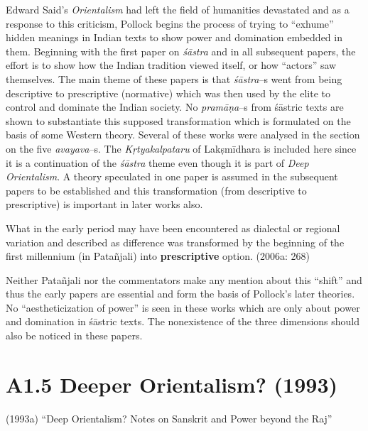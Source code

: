 Edward Said’s \textit{Orientalism} had left the field of humanities devastated and as a response to this criticism, Pollock begins the process of trying to “exhume” hidden meanings in Indian texts to show power and domination embedded in them. Beginning with the first paper on \textit{śāstra} and in all subsequent papers, the effort is to show how the Indian tradition viewed itself, or how “actors” saw themselves. The main theme of these papers is that \textit{śāstra}–s went from being descriptive to prescriptive (normative) which was then used by the elite to control and dominate the Indian society. No \textit{pramāṇa}–s from śāstric texts are shown to substantiate this supposed transformation which is formulated on the basis of some Western theory. Several of these works were analysed in the section on the five \textit{avayava}–s\break [4.6]. The \textit{Kṛtyakalpataru} of Lakṣmīdhara is included here since it is a continuation of the \textit{śāstra} theme even though it is part of \textit{Deep Orientalism}. A theory speculated in one paper is assumed in the subsequent papers to be established and this transformation (from descriptive to prescriptive) is important in later works also.

\begin{myquote}
What in the early period may have been encountered as dialectal or regional variation and described as difference was transformed by the beginning of the ﬁrst millennium (in Patañjali) into \textbf{prescriptive} option. (2006a: 268)
\end{myquote}

Neither Patañjali nor the commentators make any mention about this “shift” and thus the early papers are essential and form the basis of Pollock’s later theories. No “aestheticization of power” is seen in these works which are only about power and domination in śāstric texts. The nonexistence of the three dimensions should also be noticed in these papers.

\vspace{-.5cm}

\section*{A1.5 Deeper Orientalism? (1993)}

(1993a) “Deep Orientalism? Notes on Sanskrit and Power beyond the Raj”

